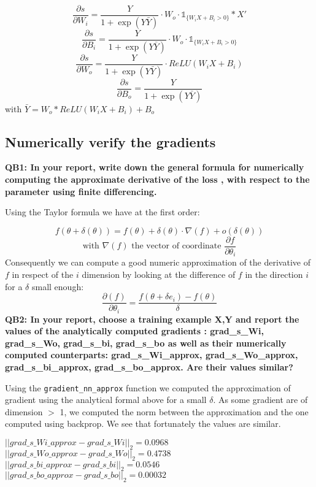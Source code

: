 \documentclass[a4paper,11pt]{exam}
\begin{document}
\[
\frac{\partial s}{\partial W_i} =
	\frac{Y}{1 + \exp(Y\bar{Y})} \cdot W_o \cdot \mathbb 1_{\{W_iX + B_i > 0\}} * X'
\]
\[
\frac{\partial s}{\partial B_i} =
	\frac{Y}{1 + \exp(Y\bar{Y})} \cdot W_o \cdot  \mathbb 1_{\{W_iX + B_i > 0\}}
\]
\[
\frac{\partial s}{\partial W_o} =
	\frac{Y}{1 + \exp(Y\bar{Y})}  \cdot ReLU(W_iX + B_i)
\]
\[
\frac{\partial s}{\partial B_o} =
	\frac{Y}{1 + \exp(Y\bar{Y})}
\]
with $\bar{Y} = W_o * ReLU(W_iX + B_i) + B_o$

\subsection{Numerically verify the gradients}

\textbf{QB1: In your report, write down the general formula for numerically computing the approximate derivative of the loss , with respect to the parameter  using finite differencing.\\}

Using the Taylor formula we have at the first order:

\[
f(\theta + \delta(\theta)) = f(\theta) + \delta(\theta) \cdot \nabla(f) + o(\delta(\theta))
\]
\[
\text{with } \nabla(f) \text{ the vector of coordinate } \frac{\partial f}{\partial \theta_{i}}
\]
Consequently we can compute a good numeric approximation of the derivative of $f$ in respect of the $i$ dimension by looking at the difference of $f$ in the direction $i$ for a $\delta$ small enough:
\[
\frac{\partial(f)}{\partial \theta_{i}} = \frac{f(\theta + \delta e_{i}) - f(\theta) }{\delta}
\]
\textbf{QB2: In your report, choose a training example {X,Y} and report the values of the analytically computed gradients :  grad\_s\_Wi, grad\_s\_Wo, grad\_s\_bi, grad\_s\_bo as well as their numerically computed counterparts: grad\_s\_Wi\_approx, grad\_s\_Wo\_approx, grad\_s\_bi\_approx, grad\_s\_bo\_approx. Are their values similar?\\}

Using the \verb|gradient_nn_approx| function we computed the approximation of gradient using the analytical formal above for a small $\delta$. As some gradient are of dimension $>$ 1, we computed the norm between the approximation and the one computed using backprop. We see that fortunately the values are similar.

\begin{center}
$|| grad\_s\_Wi\_approx - grad\_s\_Wi ||_{2} =  0.0968$\\
$|| grad\_s\_Wo\_approx - grad\_s\_Wo ||_{2} = 0.4738$\\
$|| grad\_s\_bi\_approx - grad\_s\_bi ||_{2} = 0.0546$\\
$|| grad\_s\_bo\_approx - grad\_s\_bo ||_{2} = 0.00032$
\end{center}
\end{document}
